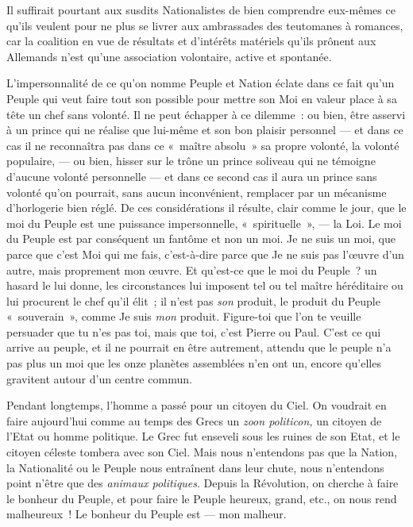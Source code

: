 \documentclass[french,twoside]{book} %
\begin{document}
Il suffirait pourtant aux susdits Nationalistes de bien comprendre eux-mêmes ce qu’ils veulent pour ne plus se livrer aux ambrassades des teutomanes à romances, car la coalition en vue de résultats et d’intérêts matériels qu’ils prônent aux Allemands n’est qu’une association volontaire, active et spontanée.\par
L’impersonnalité de ce qu’on nomme Peuple et Nation éclate dans ce fait qu’un Peuple qui veut faire tout son possible pour mettre son Moi en valeur place à sa tête un chef sans volonté. Il ne peut échapper à ce dilemme : ou bien, être asservi à un prince qui ne réalise que lui-même et son bon plaisir personnel — et dans ce cas il ne reconnaîtra pas dans ce « maître absolu » sa propre volonté, la volonté populaire, — ou bien, hisser sur le trône un prince soliveau qui ne témoigne d’aucune  volonté personnelle — et dans ce second cas il aura un prince sans volonté qu’on pourrait, sans aucun inconvénient, remplacer par un mécanisme d’horlogerie bien réglé. De ces considérations il résulte, clair comme le jour, que le moi du Peuple est une puissance impersonnelle, « spirituelle », — la Loi. Le moi du Peuple est par conséquent un fantôme et non un moi. Je ne suis un moi, que parce que c’est Moi qui me fais, c’est-à-dire parce que Je ne suis pas l’œuvre d’un autre, mais proprement mon œuvre. Et qu’est-ce que le moi du Peuple ? un hasard le lui donne, les circonstances lui imposent tel ou tel maître héréditaire ou lui procurent le chef qu’il élit ; il n’est pas \emph{son }produit, le produit du Peuple « souverain », comme Je suis \emph{mon} produit. Figure-toi que l’on te veuille persuader que tu n’es pas toi, mais que toi, c’est Pierre ou Paul. C’est ce qui arrive au peuple, et il ne pourrait en être autrement, attendu que le peuple n’a pas plus un moi que les onze planètes assemblées n’en ont un, encore qu’elles gravitent autour d’un centre commun.\par
Pendant longtemps, l’homme a passé pour un citoyen du Ciel. On voudrait en faire aujourd’hui comme au temps des Grecs un \emph{zoon politicon,} un citoyen de l’Etat ou homme politique. Le Grec fut enseveli sous les ruines de son Etat, et le citoyen céleste tombera avec son Ciel. Mais nous n’entendons pas que la Nation, la Nationalité ou le Peuple nous entraînent dans leur chute, nous n’entendons point n’être que des \emph{animaux politiques}. Depuis la Révolution, on cherche à faire le bonheur du Peuple, et pour faire le Peuple heureux, grand, etc., on nous rend malheureux ! Le bonheur du Peuple est — mon malheur.\par
\end{document}
